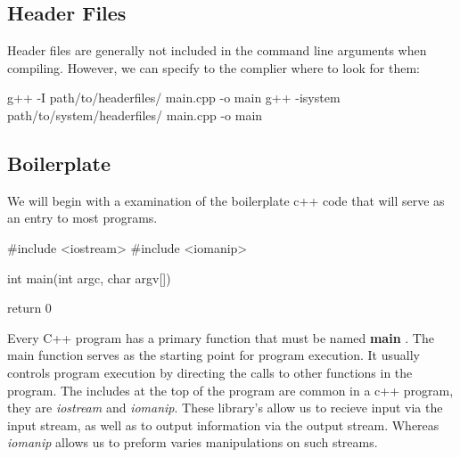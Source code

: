 \documentclass{report}
\begin{document}
    \bigbreak \noindent 
    \subsection{Header Files}
    Header files are generally not included in the command line arguments when compiling. However, we can specify to the complier where to look for them:
    \bigbreak \noindent 
    
    \begin{cppcode}
g++ -I path/to/headerfiles/ main.cpp -o main
g++ -isystem path/to/system/headerfiles/ main.cpp -o main
    \end{cppcode}
    



    \pagebreak
    \markboth{}{}
    \bigbreak \noindent 
    \subsection{Boilerplate}
    \bigbreak \noindent 
    We will begin with a examination of the boilerplate c++ code that will serve as an entry to most programs.
    
    \begin{cppcode}
#include <iostream>
#include <iomanip>

int main(int argc, char argv[]){

    return 0
}
    \end{cppcode}
    
    \bigbreak \noindent 
    Every C++ program has a primary function that must be named \textbf{main} . The main function serves as the starting point for program execution. It usually controls program execution by directing the calls to other functions in the program.
    \bigbreak \noindent 
    The includes at the top of the program are common in a c++ program, they are \textit{iostream} and \textit{iomanip}. These library's allow us to recieve input via the input stream, as well as to output information  via the output stream. Whereas \textit{iomanip} allows us to preform varies manipulations on such streams.
    \bigbreak \noindent 

    \bigbreak \noindent 
\end{document}
